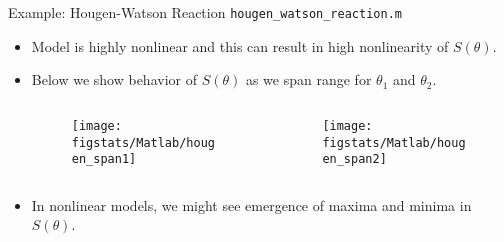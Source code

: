 \documentclass[9pt]{beamer}
\begin{document}
%
\begin{frame}{Example: Hougen-Watson Reaction \footnotesize{\texttt{hougen\_watson\_reaction.m}}}

\begin{itemize}
\setlength{\itemsep}{10pt}
\item Model is highly nonlinear and this can result in high nonlinearity of $S(\theta)$.
\item Below we show behavior of $S(\theta)$ as we span range for $\theta_1$ and $\theta_2$.
\begin{columns}
\begin{column}{0.5\textwidth}
\begin{figure}[!htb]
    \centering
	\texttt{[image: figstats/Matlab/hougen\_span1]}
\end{figure}
\end{column}
\begin{column}{0.5\textwidth}
\begin{figure}[!htb]
    \centering
	\texttt{[image: figstats/Matlab/hougen\_span2]}
\end{figure}
\end{column}
\end{columns}
\item In nonlinear models, we might see emergence of maxima and minima in $S(\theta)$.

\end{itemize}


\end{frame}
\end{document}
